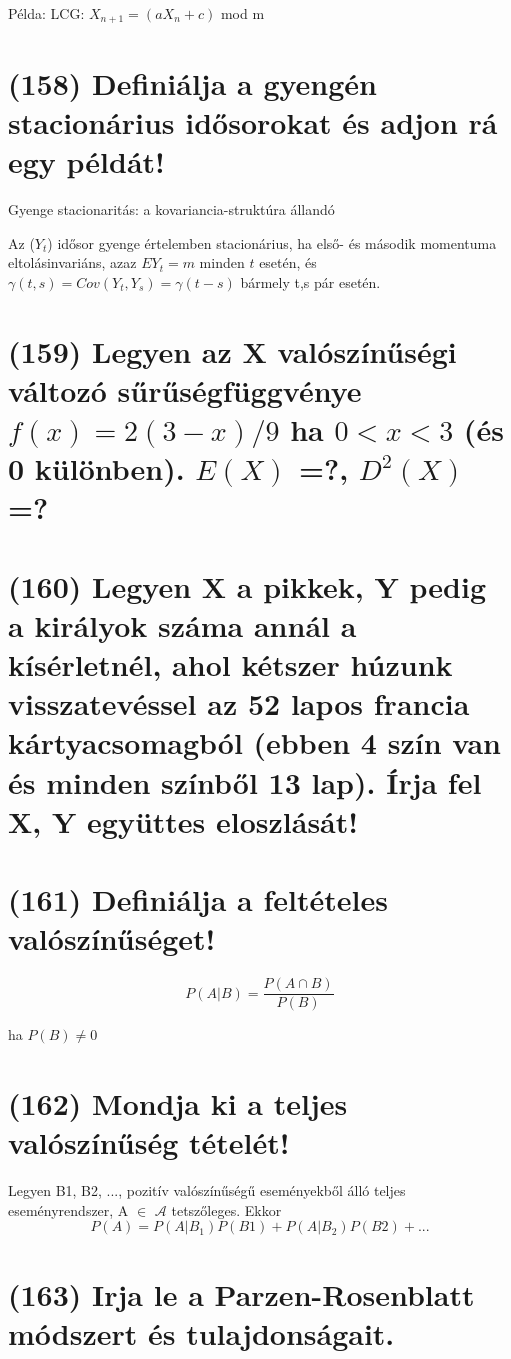 \documentclass[12p]{article}
\begin{document}
Példa: LCG: $X_{n+1} = (aX_n + c)$ mod m

\section{(158) Definiálja a gyengén stacionárius idősorokat és adjon rá egy példát!}

Gyenge stacionaritás: a kovariancia-struktúra állandó

Az ($Y_t$) idősor gyenge értelemben stacionárius, ha első- és második momentuma eltolásinvariáns, azaz $EY_t = m$ minden $t$ esetén, és $\gamma(t,s) = Cov(Y_t, Y_s) = \gamma(t - s)$ bármely t,s pár esetén.

\section{(159) Legyen az X valószínűségi változó sűrűségfüggvénye $f(x) = 2(3 - x)/9$ ha $0 < x < 3$ (és 0 különben). $E(X)$ =?, $D^2(X)$ =? }

\section{(160) Legyen X a pikkek, Y pedig a királyok száma annál a kísérletnél, ahol kétszer húzunk
visszatevéssel az 52 lapos francia kártyacsomagból (ebben 4 szín van és minden színből 13
lap). Írja fel X, Y együttes eloszlását!}

\section{(161) Definiálja a feltételes valószínűséget!}

$$P(A|B) = \frac{P(A \cap B)}{P(B)}$$

ha $P(B) \neq 0$

\section{(162) Mondja ki a teljes valószínűség tételét!}

Legyen B1, B2, ..., pozitív valószínűségű eseményekből álló teljes eseményrendszer, A $\in$ $\mathscr{A}$ tetszőleges. Ekkor
$$P(A) = P(A|B_1)P(B1)+P(A|B_2)P(B2)+ ...$$


\section{(163) Irja le a Parzen-Rosenblatt módszert és tulajdonságait.}
\end{document}
